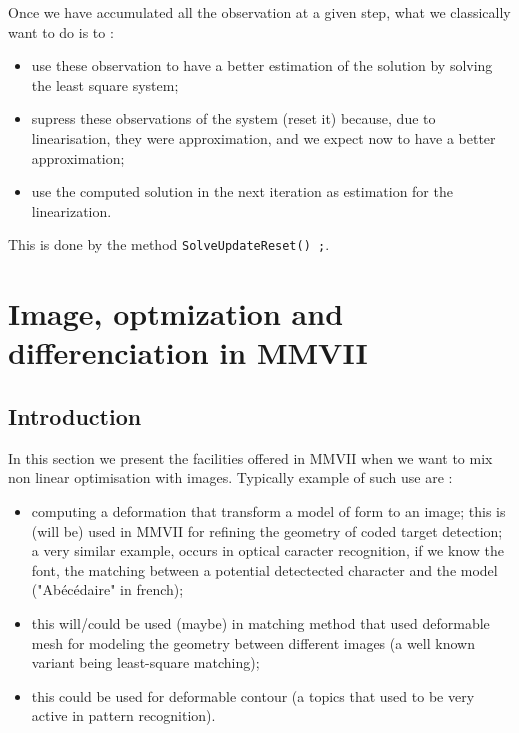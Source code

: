 Once we have accumulated all the observation at a given step, what we classically
want to do is to :

\begin{itemize}
       \item use these observation  to have a better estimation of the solution by solving
             the least square system;

       \item supress  these observations of the system (reset it) because, due to linearisation,
             they were approximation, and we expect now to have a better approximation;

       \item use the computed solution in the next iteration as estimation for the linearization.
\end{itemize}

This is done by the method {\tt SolveUpdateReset() ;}.


\section{Image, optmization and differenciation in MMVII}

\label{ImageOptDiff}

\subsection{Introduction}

In this section we present the facilities offered in MMVII when we want to mix non
linear optimisation with images. Typically example of such use are :

\begin{itemize}
     \item computing a deformation that transform a model of form  to an image;
           this is (will be) used  in MMVII for refining the  geometry of coded target detection;
           a very similar example, occurs in optical caracter recognition, if we know the font,
           the matching between a potential detectected character and the model ("Ab\'ec\'edaire" in french);

      \item this will/could be used (maybe) in matching method that used deformable mesh for modeling
            the geometry between different images (a well known variant being least-square matching);

      \item this could be used for deformable contour (a topics that used to be very active in 
            pattern recognition).
\end{itemize}

